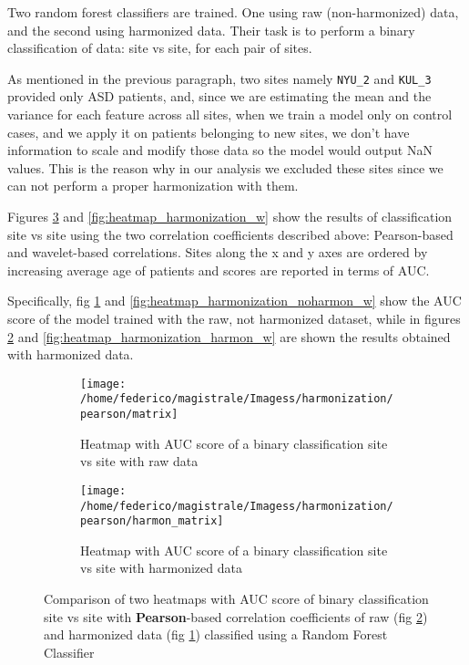 \documentclass[11pt]{report}
\begin{document}
Two random forest classifiers are trained.
One using raw (non-harmonized) data, and the second using harmonized data.
Their task is to perform a binary classification of data: site vs site, for each pair of sites.

\begin{notes}
\item As mentioned in the previous paragraph, two sites namely \texttt{NYU\_2} and \texttt{KUL\_3} provided only ASD patients, and, since we are estimating the mean and the variance for each feature across all sites, when we train a model only on control cases, and we apply it on patients belonging to new sites, we don't have information to scale and modify those data so the model would output NaN values.
This is the reason why in our analysis we excluded these sites since we can not perform a proper harmonization with them.
\end{notes}

Figures \ref{fig:heatmap_harmonization} and \ref{fig:heatmap_harmonization_w} show the results of classification site vs site using the two correlation coefficients described above: Pearson-based and wavelet-based correlations.
Sites along the x and y axes are ordered by increasing average age of patients and scores are reported in terms of AUC.

Specifically, fig \ref{fig:heatmap_harmonization_noharmon} and \ref{fig:heatmap_harmonization_noharmon_w} show the AUC score of the model trained with the raw, not harmonized dataset, while in figures \ref{fig:heatmap_harmonization_harmon} and \ref{fig:heatmap_harmonization_harmon_w} are shown the results obtained with harmonized data.



\begin{figure}
\centering
\begin{subfigure}[b]{0.7\textwidth}
   \texttt{[image: /home/federico/magistrale/Imagess/harmonization/pearson/matrix]}
   \caption{Heatmap with AUC score of a binary classification site vs site with raw data}
   \label{fig:heatmap_harmonization_noharmon}
\end{subfigure}

\begin{subfigure}[b]{0.7\textwidth}
   \texttt{[image: /home/federico/magistrale/Imagess/harmonization/pearson/harmon\_matrix]}
   \caption{Heatmap with AUC score of a binary classification site vs site with harmonized data}
   \label{fig:heatmap_harmonization_harmon}
\end{subfigure}

\caption{Comparison of two heatmaps with AUC score of binary classification site vs site with \textbf{Pearson}-based correlation coefficients of raw (fig \ref{fig:heatmap_harmonization_harmon}) and harmonized data (fig \ref{fig:heatmap_harmonization_noharmon}) classified using a Random Forest Classifier
}
\label{fig:heatmap_harmonization}
\end{figure}
\end{document}
